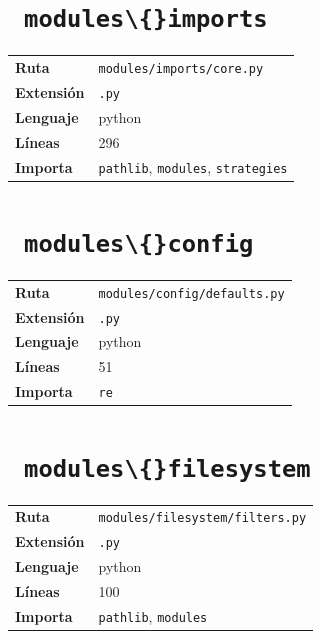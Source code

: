 \documentclass[12pt, a4paper]{report}
\begin{document}
\medskip

\section{\ \texttt{modules\textbackslash\{\}imports}}

\begin{fichabox}
\small
\begin{tabular}{@{}ll@{}}
  \textbf{Ruta} & \texttt{modules/imports/core.py} \\
  \textbf{Extensión} & \texttt{.py} \\
  \textbf{Lenguaje} & python \\
  \textbf{Líneas} & 296 \\
  \textbf{Importa} & \parbox[t]{10cm}{\texttt{pathlib}, \texttt{modules}, \texttt{strategies}} \\
\end{tabular}
\end{fichabox}

\medskip

\section{\ \texttt{modules\textbackslash\{\}config}}

\begin{fichabox}
\small
\begin{tabular}{@{}ll@{}}
  \textbf{Ruta} & \texttt{modules/config/defaults.py} \\
  \textbf{Extensión} & \texttt{.py} \\
  \textbf{Lenguaje} & python \\
  \textbf{Líneas} & 51 \\
  \textbf{Importa} & \parbox[t]{10cm}{\texttt{re}} \\
\end{tabular}
\end{fichabox}

\medskip

\section{\ \texttt{modules\textbackslash\{\}filesystem}}

\begin{fichabox}
\small
\begin{tabular}{@{}ll@{}}
  \textbf{Ruta} & \texttt{modules/filesystem/filters.py} \\
  \textbf{Extensión} & \texttt{.py} \\
  \textbf{Lenguaje} & python \\
  \textbf{Líneas} & 100 \\
  \textbf{Importa} & \parbox[t]{10cm}{\texttt{pathlib}, \texttt{modules}} \\
\end{tabular}
\end{fichabox}
\end{document}
